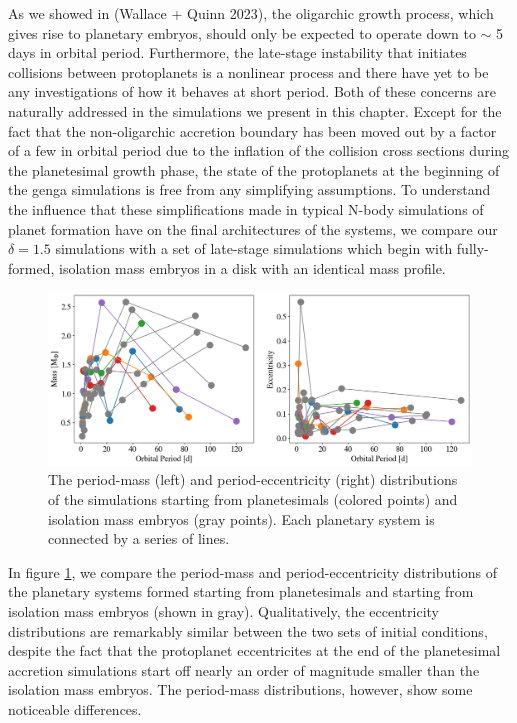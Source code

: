 As we showed in (Wallace + Quinn 2023), the oligarchic growth process, which gives rise to planetary embryos, should only be expected to operate down to $\sim$ 5 days in orbital period. Furthermore, the late-stage instability that initiates collisions between protoplanets is a nonlinear process and there have yet to be any investigations of how it behaves at short period. Both of these concerns are naturally addressed in the simulations we present in this chapter. Except for the fact that the non-oligarchic accretion boundary has been moved out by a factor of a few in orbital period due to the inflation of the collision cross sections during the planetesimal growth phase, the state of the protoplanets at the beginning of the {\sc genga} simulations is free from any simplifying assumptions. To understand the influence that these simplifications made in typical N-body simulations of planet formation have on the final architectures of the systems, we compare our $\delta = 1.5$ simulations with a set of late-stage simulations which begin with fully-formed, isolation mass embryos in a disk with an identical mass profile.

\begin{figure}
\begin{center}
    \includegraphics[width=\textwidth]{figures/stip/per_mass_ecc_iso_comp.png}
    \caption{The period-mass (left) and period-eccentricity (right) distributions of the simulations starting from planetesimals (colored points) and isolation mass embryos (gray points). Each planetary system is connected by a series of lines.\label{fig:per_mass_ecc_iso_comp}}
\end{center}
\end{figure}

In figure \ref{fig:per_mass_ecc_iso_comp}, we compare the period-mass and period-eccentricity distributions of the planetary systems formed starting from planetesimals and starting from isolation mass embryos (shown in gray). Qualitatively, the eccentricity distributions are remarkably similar between the two sets of initial conditions, despite the fact that the protoplanet eccentricites at the end of the planetesimal accretion simulations start off nearly an order of magnitude smaller than the isolation mass embryos. The period-mass distributions, however, show some noticeable differences.

